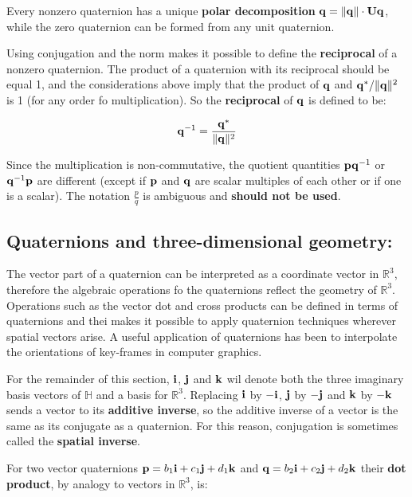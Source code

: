 Every nonzero quaternion has a unique \textbf{polar decomposition}
$ \mathbf{q} = \| {\mathbf{q}} \| \cdot \mathbf{Uq} $, while the zero quaternion can be formed
from any unit quaternion.

Using conjugation and the norm makes it possible to define the \textbf{reciprocal}
of a nonzero quaternion. The product of a quaternion with its reciprocal should
be equal 1, and the considerations above imply that the product of $ \mathbf{q} $ and
$ \mathbf{q}^{*} / \| {\mathbf{q}} \|^2 $ is 1 (for any order fo multiplication). So the
\textbf{reciprocal} of $ \mathbf{q} $ is defined to be:

\begin{equation}
    \mathbf{q}^{-1} = \frac{\mathbf{q}^{*}}{\| {\mathbf{q}} \|^2}
\end{equation}

Since the multiplication is non-commutative, the quotient quantities
$ \mathbf{p} \mathbf{q}^{-1} $ or $ \mathbf{q}^{-1} \mathbf{p} $ are different (except if $ \mathbf{p} $
and $ \mathbf{q} $ are scalar multiples of each other or if one is a scalar).
The notation $ \frac{p}{q} $ is ambiguous and \textbf{should not be used}.



\subsection{Quaternions and three-dimensional geometry:}

The vector part of a quaternion can be interpreted as a coordinate vector
in $ \mathbb{R}^3 $, therefore the algebraic operations fo the quaternions reflect
the geometry of $ \mathbb{R}^3 $. Operations such as the vector dot and cross
products can be defined in terms of quaternions and thei makes it possible to apply
quaternion techniques wherever spatial vectors arise. A useful application of quaternions
has been to interpolate the orientations of key-frames in computer graphics.

For the remainder of this section, $ \mathbf{i} $, $ \mathbf{j} $ and $ \mathbf{k} $ wil denote
both the three imaginary basis vectors of $ \mathbb{H} $ and a basis for $ \mathbb{R}^3 $.
Replacing $ \mathbf{i} $ by $ -\mathbf{i} $, $ \mathbf{j} $ by $ -\mathbf{j} $ and $ \mathbf{k} $ by $ -\mathbf{k} $
sends a vector to its \textbf{additive inverse}, so the additive inverse of a vector
is the same as its conjugate as a quaternion. For this reason, conjugation
is sometimes called the \textbf{spatial inverse}.

For two vector quaternions $ \mathbf{p} = b_1 \mathbf{i} + c_1 \mathbf{j} + d_1 \mathbf{k} $ and
$ \mathbf{q} = b_2 \mathbf{i} + c_2 \mathbf{j} + d_2 \mathbf{k} $ their \textbf{dot product}, by
analogy to vectors in $ \mathbb{R}^3 $, is:

